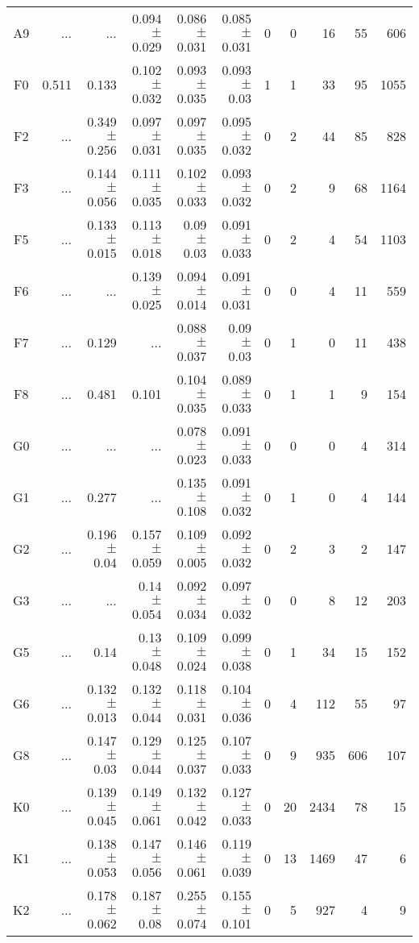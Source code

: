 \begin{table}[t]
\begin{table}[t]
\begin{center}
\begin{tabular}{c|rrrrr|rrrrr}
    A9	&	 ...	&	 ...	&	0.094$\pm$0.029	&	0.086$\pm$0.031	&	0.085$\pm$0.031	&	0	&	0	&	16	&	55	&	606	\\
    F0	&	0.511	&	0.133	&	0.102$\pm$0.032	&	0.093$\pm$0.035	&	0.093$\pm$0.03	&	1	&	1	&	33	&	95	&	1055	\\
    F2	&	 ...	&	0.349$\pm$0.256	&	0.097$\pm$0.031	&	0.097$\pm$0.035	&	0.095$\pm$0.032	&	0	&	2	&	44	&	85	&	828	\\
    F3	&	 ...	&	0.144$\pm$0.056	&	0.111$\pm$0.035	&	0.102$\pm$0.033	&	0.093$\pm$0.032	&	0	&	2	&	9	&	68	&	1164	\\
    F5	&	 ...	&	0.133$\pm$0.015	&	0.113$\pm$0.018	&	0.09$\pm$0.03	&	0.091$\pm$0.033	&	0	&	2	&	4	&	54	&	1103	\\
    F6	&	 ...	&	 ...	&	0.139$\pm$0.025	&	0.094$\pm$0.014	&	0.091$\pm$0.031	&	0	&	0	&	4	&	11	&	559	\\
    F7	&	 ...	&	0.129	&	 ...	&	0.088$\pm$0.037	&	0.09$\pm$0.03	&	0	&	1	&	0	&	11	&	438	\\
    F8	&	 ...	&	0.481	&	0.101	&	0.104$\pm$0.035	&	0.089$\pm$0.033	&	0	&	1	&	1	&	9	&	154	\\
    G0	&	 ...	&	 ...	&	 ...	&	0.078$\pm$0.023	&	0.091$\pm$0.033	&	0	&	0	&	0	&	4	&	314	\\
    G1	&	 ...	&	0.277	&	 ...	&	0.135$\pm$0.108	&	0.091$\pm$0.032	&	0	&	1	&	0	&	4	&	144	\\
    G2	&	 ...	&	0.196$\pm$0.04	&	0.157$\pm$0.059	&	0.109$\pm$0.005	&	0.092$\pm$0.032	&	0	&	2	&	3	&	2	&	147	\\
    G3	&	 ...	&	 ...	&	0.14$\pm$0.054	&	0.092$\pm$0.034	&	0.097$\pm$0.032	&	0	&	0	&	8	&	12	&	203	\\
    G5	&	 ...	&	0.14	&	0.13$\pm$0.048	&	0.109$\pm$0.024	&	0.099$\pm$0.038	&	0	&	1	&	34	&	15	&	152	\\
    G6	&	 ...	&	0.132$\pm$0.013	&	0.132$\pm$0.044	&	0.118$\pm$0.031	&	0.104$\pm$0.036	&	0	&	4	&	112	&	55	&	97	\\
    G8	&	 ...	&	0.147$\pm$0.03	&	0.129$\pm$0.044	&	0.125$\pm$0.037	&	0.107$\pm$0.033	&	0	&	9	&	935	&	606	&	107	\\
    K0	&	 ...	&	0.139$\pm$0.045	&	0.149$\pm$0.061	&	0.132$\pm$0.042	&	0.127$\pm$0.033	&	0	&	20	&	2434	&	78	&	15	\\
    K1	&	 ...	&	0.138$\pm$0.053	&	0.147$\pm$0.056	&	0.146$\pm$0.061	&	0.119$\pm$0.039	&	0	&	13	&	1469	&	47	&	6	\\
    K2	&	 ...	&	0.178$\pm$0.062	&	0.187$\pm$0.08	&	0.255$\pm$0.074	&	0.155$\pm$0.101	&	0	&	5	&	927	&	4	&	9	\\

\end{tabular}
\end{center}
\end{table}
\end{table}
